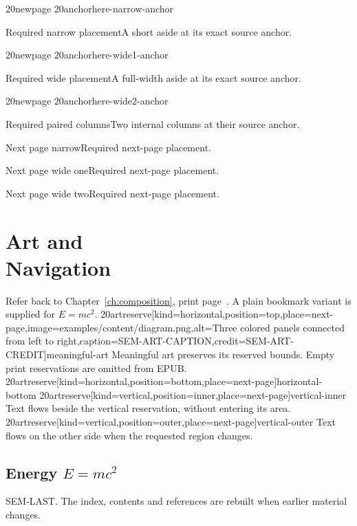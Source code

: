 \documentclass{m20book}
\begin{document}
\m20newpage
\m20anchor{here-narrow-anchor}
\begin{m20sidebar}[id=here-narrow,place=here]{Required narrow placement}A short aside at its exact source anchor.\end{m20sidebar}
\m20newpage
\m20anchor{here-wide1-anchor}
\begin{m20sidebarwide}[id=here-wide1,columns=1,place=here]{Required wide placement}A full-width aside at its exact source anchor.\end{m20sidebarwide}
\m20newpage
\m20anchor{here-wide2-anchor}
\begin{m20sidebarwide}[id=here-wide2,columns=2,place=here]{Required paired columns}Two internal columns at their source anchor.\end{m20sidebarwide}
\begin{m20sidebar}[id=next-narrow,place=next-page]{Next page narrow}Required next-page placement.\end{m20sidebar}
\begin{m20sidebarwide}[id=next-wide1,columns=1,place=next-page]{Next page wide one}Required next-page placement.\end{m20sidebarwide}
\begin{m20sidebarwide}[id=next-wide2,columns=2,place=next-page]{Next page wide two}Required next-page placement.\end{m20sidebarwide}
\chapter{Art and\\Navigation}
\label{ch:art}
Refer back to Chapter~\ref{ch:composition}, print page~\pageref{ch:composition}.
A plain bookmark variant is supplied for \texorpdfstring{$E=mc^2$}{Energy equals mass times c squared}.
\m20artreserve[kind=horizontal,position=top,place=next-page,image=examples/content/diagram.png,alt={Three colored panels connected from left to right},caption={SEM-ART-CAPTION},credit={SEM-ART-CREDIT}]{meaningful-art}
Meaningful art preserves its reserved bounds. Empty print reservations are omitted from EPUB.
\m20artreserve[kind=horizontal,position=bottom,place=next-page]{horizontal-bottom}
\m20artreserve[kind=vertical,position=inner,place=next-page]{vertical-inner}
Text flows beside the vertical reservation, without entering its area.
\m20artreserve[kind=vertical,position=outer,place=next-page]{vertical-outer}
Text flows on the other side when the requested region changes.
\section[Energy]{Energy $E=mc^2$}
\label{sec:energy}
SEM-LAST. The index, contents and references are rebuilt when earlier material changes.
\printindex
\end{document}
